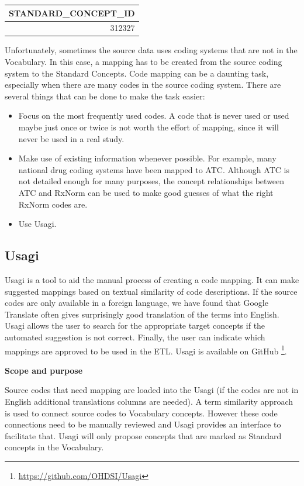 \documentclass[11pt]{book}
\providecommand{\tightlist}{%
  \setlength{\itemsep}{0pt}\setlength{\parskip}{0pt}}
\let\rmarkdownfootnote\footnote%
\def\footnote{\protect\rmarkdownfootnote}
\theoremstyle{definition}
\theoremstyle{definition}
\theoremstyle{definition}
\theoremstyle{remark}
\begin{document}
\begin{longtable}[]{@{}r@{}}
\toprule
STANDARD\_CONCEPT\_ID\tabularnewline
\midrule
\endhead
312327\tabularnewline
\bottomrule
\end{longtable}

Unfortunately, sometimes the source data uses coding systems that are not in the Vocabulary. In this case, a mapping has to be created from the source coding system to the Standard Concepts. Code mapping can be a daunting task, especially when there are many codes in the source coding system. There are several things that can be done to make the task easier:

\begin{itemize}
\tightlist
\item
  Focus on the most frequently used codes. A code that is never used or used maybe just once or twice is not worth the effort of mapping, since it will never be used in a real study.
\item
  Make use of existing information whenever possible. For example, many national drug coding systems have been mapped to ATC. Although ATC is not detailed enough for many purposes, the concept relationships between ATC and RxNorm can be used to make good guesses of what the right RxNorm codes are.
\item
  Use Usagi.
\end{itemize}

\hypertarget{usagi}{%
\subsection{Usagi}\label{usagi}}

Usagi is a tool to aid the manual process of creating a code mapping. It can make suggested mappings based on textual similarity of code descriptions. If the source codes are only available in a foreign language, we have found that Google Translate often gives surprisingly good translation of the terms into English. Usagi allows the user to search for the appropriate target concepts if the automated suggestion is not correct. Finally, the user can indicate which mappings are approved to be used in the ETL. Usagi is available on GitHub \footnote{\url{https://github.com/OHDSI/Usagi}}.  

\textbf{Scope and purpose}

Source codes that need mapping are loaded into the Usagi (if the codes are not in English additional translations columns are needed). A term similarity approach is used to connect source codes to Vocabulary concepts. However these code connections need to be manually reviewed and Usagi provides an interface to facilitate that. Usagi will only propose concepts that are marked as Standard concepts in the Vocabulary.
\end{document}
